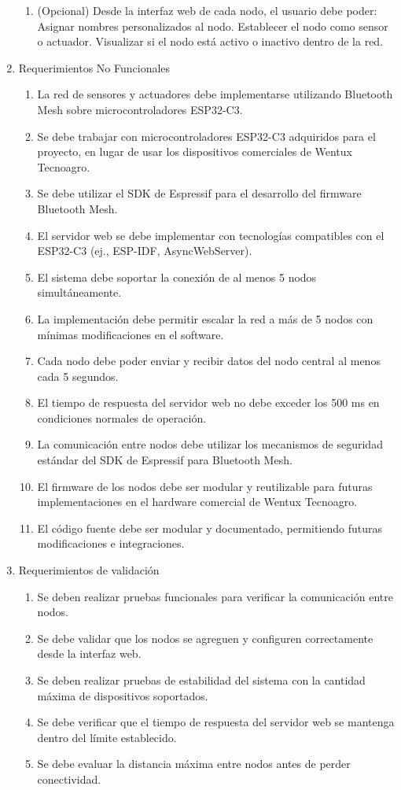\documentclass[
11pt, %
]{charter}
\begin{document}
\begin{enumerate}
\begin{enumerate}
		\item (Opcional) Desde la interfaz web de cada nodo, el usuario debe poder:
		\subitem Asignar nombres personalizados al nodo.
		\subitem Establecer el nodo como sensor o actuador.
		\subitem Visualizar si el nodo está activo o inactivo dentro de la red.
	\end{enumerate}
	
\item Requerimientos No Funcionales
	\begin{enumerate}
		\item La red de sensores y actuadores debe implementarse utilizando Bluetooth Mesh sobre microcontroladores ESP32-C3.
		\item Se debe trabajar con microcontroladores ESP32-C3 adquiridos para el proyecto, en lugar de usar los dispositivos comerciales de Wentux Tecnoagro.
		\item Se debe utilizar el SDK de Espressif para el desarrollo del firmware Bluetooth Mesh.
		\item El servidor web se debe implementar con tecnologías compatibles con el ESP32-C3 (ej., ESP-IDF, AsyncWebServer).
		\item El sistema debe soportar la conexión de al menos 5 nodos simultáneamente.
		\item La implementación debe permitir escalar la red a más de 5 nodos con mínimas modificaciones en el software.
		\item Cada nodo debe poder enviar y recibir datos del nodo central al menos cada 5 segundos.		
		\item El tiempo de respuesta del servidor web no debe exceder los 500 ms en condiciones normales de operación.
		\item La comunicación entre nodos debe utilizar los mecanismos de seguridad estándar del SDK de Espressif para Bluetooth Mesh.
		\item El firmware de los nodos debe ser modular y reutilizable para futuras implementaciones en el hardware comercial de Wentux Tecnoagro.
		\item El código fuente debe ser modular y documentado, permitiendo futuras modificaciones e integraciones.
	\end{enumerate}
	
\item Requerimientos de validación
	\begin{enumerate}
		\item Se deben realizar pruebas funcionales para verificar la comunicación entre nodos.
		\item Se debe validar que los nodos se agreguen y configuren correctamente desde la interfaz web.
		\item Se deben realizar pruebas de estabilidad del sistema con la cantidad máxima de dispositivos soportados.
		\item Se debe verificar que el tiempo de respuesta del servidor web se mantenga dentro del límite establecido.
		\item Se debe evaluar la distancia máxima entre nodos antes de perder conectividad.
	\end{enumerate}


\end{enumerate}
\end{document}
